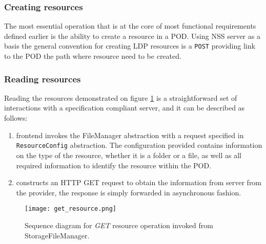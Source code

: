 \subsubsection{Creating resources}

The most essential operation that is at the core of most functional requirements defined earlier is the ability to create a resource in a POD. Using NSS server as a basis the general convention for creating LDP resources is a \texttt{POST}  providing  link to the POD  the path where resource need to be created. 

\subsubsection{Reading resources}

Reading the resources demonstrated on figure \ref{fig:lps_get_resource_sequence} is a straightforward set of interactions with a \solid{} specification compliant server, and it can be described as follows:

\begin{enumerate}
    \item \lpa{} frontend invokes the FileManager abstraction with a request specified in \texttt{ResourceConfig} abstraction. The configuration provided contains information on the type of the resource, whether it is a folder or a file, as well as all required information to identify the resource within the POD.
    \item \lpas{} constructs an HTTP GET request to obtain the information from \solid{} server from the provider, the response is simply forwarded in asynchronous fashion.
\end{enumerate}

 
\begin{figure}[h]
\centering
\texttt{[image: get\_resource.png]}
\caption{Sequence diagram for \textit{GET} resource operation invoked from StorageFileManager.}
\label{fig:lps_get_resource_sequence}
\end{figure}

